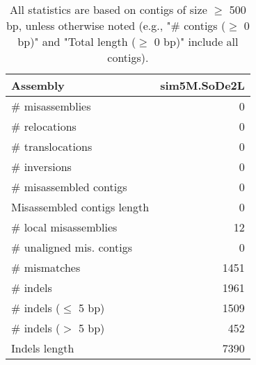 \documentclass[12pt,a4paper]{article}
\begin{document}
\begin{table}[ht]
\begin{center}
\caption{All statistics are based on contigs of size $\geq$ 500 bp, unless otherwise noted (e.g., "\# contigs ($\geq$ 0 bp)" and "Total length ($\geq$ 0 bp)" include all contigs).}
\begin{tabular}{|l*{1}{|r}|}
\hline
Assembly & sim5M.SoDe2L \\ \hline
\# misassemblies & 0 \\ \hline
\hspace{5mm}\# relocations & 0 \\ \hline
\hspace{5mm}\# translocations & 0 \\ \hline
\hspace{5mm}\# inversions & 0 \\ \hline
\# misassembled contigs & 0 \\ \hline
Misassembled contigs length & 0 \\ \hline
\# local misassemblies & 12 \\ \hline
\# unaligned mis. contigs & 0 \\ \hline
\# mismatches & 1451 \\ \hline
\# indels & 1961 \\ \hline
\hspace{5mm}\# indels ($\leq$ 5 bp) & 1509 \\ \hline
\hspace{5mm}\# indels ($>$ 5 bp) & 452 \\ \hline
Indels length & 7390 \\ \hline
\end{tabular}
\end{center}
\end{table}
\end{document}
